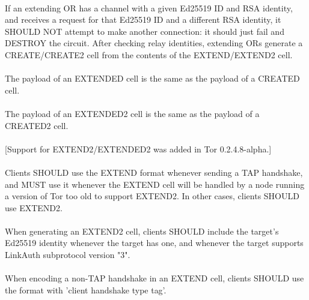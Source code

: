 \paragraph{}
If an extending OR has a channel with a given Ed25519 ID and RSA
identity, and receives a request for that Ed25519 ID and a
different RSA identity, it SHOULD NOT attempt to make another
connection: it should just fail and DESTROY the circuit.
After checking relay identities, extending ORs generate a
CREATE/CREATE2 cell from the contents of the EXTEND/EXTEND2 cell.

\paragraph{}
The payload of an EXTENDED cell is the same as the payload of a
CREATED cell.

\paragraph{}
The payload of an EXTENDED2 cell is the same as the payload of a
CREATED2 cell.

\paragraph{}
[Support for EXTEND2/EXTENDED2 was added in Tor 0.2.4.8-alpha.]

\paragraph{}
Clients SHOULD use the EXTEND format whenever sending a TAP
handshake, and MUST use it whenever the EXTEND cell will be handled
by a node running a version of Tor too old to support EXTEND2. In
other cases, clients SHOULD use EXTEND2.

\paragraph{}
When generating an EXTEND2 cell, clients SHOULD include the target's
Ed25519 identity whenever the target has one, and whenever the
target supports LinkAuth subprotocol version "3".

\paragraph{}
When encoding a non-TAP handshake in an EXTEND cell, clients SHOULD
use the format with 'client handshake type tag'.

